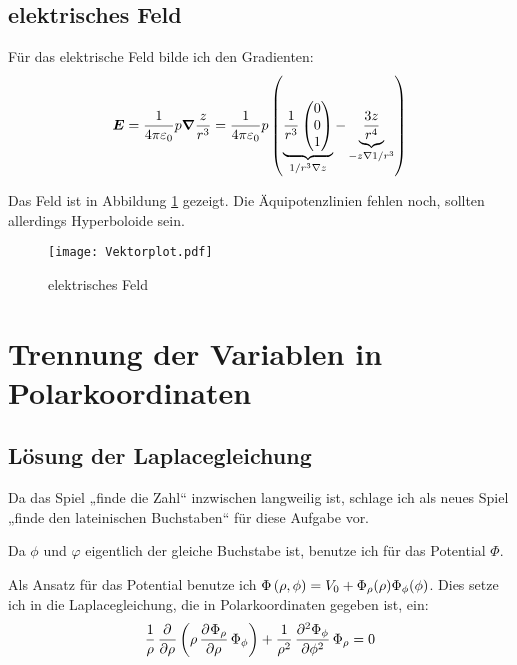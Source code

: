 \documentclass[11pt, ngerman, fleqn]{article}
\newcommand{\vnabla}{\vec \nabla}
\renewcommand{\vec}[1]{\boldsymbol{#1}}
\begin{document}
\subsection{elektrisches Feld}

Für das elektrische Feld bilde ich den Gradienten:
\[
	\vec E
	= \frac{1}{4 \pi \varepsilon_0} p \vnabla \frac{z}{r^3}
	= \frac{1}{4 \pi \varepsilon_0} p \del{ \underbrace{\frac{1}{r^3} \begin{pmatrix}
		0 \\ 0 \\ 1
\end{pmatrix}}_{1/r^3 \nabla z} - \underbrace{\frac{3z}{r^4}}_{-z \nabla 1/r^3} }
\]

Das Feld ist in Abbildung \ref{plot} gezeigt. Die Äquipotenzlinien fehlen noch, sollten allerdings Hyperboloide sein.

\begin{figure}[ht]
	\centering
	\texttt{[image: Vektorplot.pdf]}
	\caption{elektrisches Feld}
	\label{plot}
\end{figure}


\section{Trennung der Variablen in Polarkoordinaten}

\subsection{Lösung der Laplacegleichung}

\begin{footnotesize}
	Da das Spiel „finde die Zahl“ inzwischen langweilig ist, schlage ich als
	neues Spiel „finde den lateinischen Buchstaben“ für diese Aufgabe vor.
\end{footnotesize}

Da $\phi$ und $\varphi$ eigentlich der gleiche Buchstabe ist, benutze ich für
das Potential $\Phi$.

Als Ansatz für das Potential benutze ich $\Phi\del{\rho, \phi} = V_0 +
\Phi_\rho(\rho) \Phi_\phi(\phi)$. Dies setze ich in die Laplacegleichung, die
in Polarkoordinaten gegeben ist, ein:
\[
	\frac 1\rho \dpd{}\rho \del{\rho \dpd{\Phi_\rho}\rho \Phi_\phi} + \frac
	1{\rho^2} \dpd[2]{\Phi_\phi}\phi \Phi_\rho = 0
\]
\end{document}
